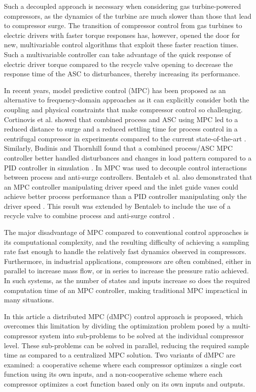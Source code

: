 Such a decoupled approach is necessary when considering gas turbine-powered compressors, as the dynamics of the turbine are much slower than those that lead to compressor surge. 
The transition of compressor control from gas turbines to electric drivers with faster torque responses has, however, opened the door for new, multivariable control algorithms that exploit these faster reaction times.
Such a multivariable controller can take advantage of the quick response of electric driver torque compared to the recycle valve opening to decrease the response time of the ASC to disturbances, thereby increasing its performance.

In recent years, model predictive control (MPC) has been proposed as an alternative to frequency-domain approaches as it can explicitly consider both the coupling and physical constraints that make compressor control so challenging.
Cortinovis et al. showed that combined process and ASC using MPC led to a reduced distance to surge and a reduced settling time for process control in a centrifugal compressor in experiments compared to the current state-of-the-art \cite{Cortinovis2015}. 
Similarly, Budinis and Thornhill found that a combined process/ASC MPC controller better handled disturbances and changes in load pattern compared to a PID controller in simulation \cite{Budinis2015}.
In \cite{Mercangoz2016} MPC was used to decouple control interactions between process and anti-surge controllers.
Bentaleb et al. also demonstrated that an MPC controller manipulating driver speed and the inlet guide vanes could achieve better process performance than a PID controller manipulating only the driver speed \cite{Bentaleb2014}.
This result was extended by Bentaleb to include the use of a recycle valve to combine process and anti-surge control \cite{Bentaleb2015}.

The major disadvantage of MPC compared to conventional control approaches is its computational complexity, and the resulting difficulty of achieving a sampling rate fast enough to handle the relatively fast dynamics observed in compressors. 
Furthermore, in industrial applications, compressors are often combined, either in parallel to increase mass flow, or in series to increase the pressure ratio achieved.
In such systems, as the number of states and inputs increase so does the required computation time of an MPC controller, making traditional MPC impractical in many situations. 

In this article a distributed MPC (dMPC) control approach is proposed, which overcomes this limitation by dividing the optimization problem posed by a multi-compressor system into sub-problems to be solved at the individual compressor level.
These sub-problems can be solved in parallel, reducing the required sample time as compared to a centralized MPC solution.
Two variants of dMPC are examined: a cooperative scheme where each compressor optimizes a single cost function using its own inputs, and a non-cooperative scheme where each compressor optimizes a cost function based only on its own inputs and outputs.

